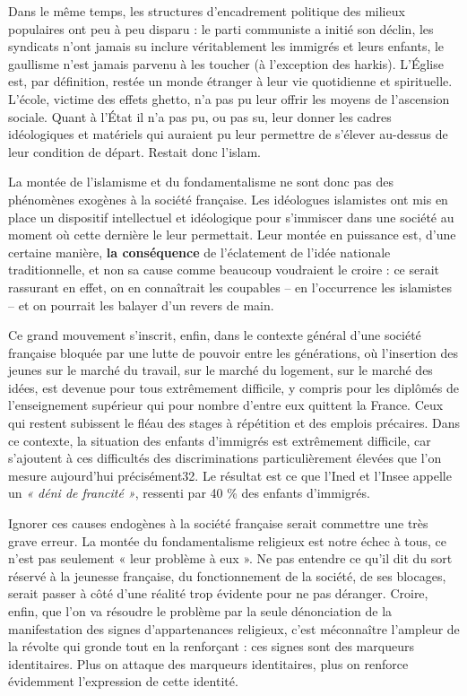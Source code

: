 Dans le même temps, les structures d'encadrement politique des milieux
populaires ont peu à peu disparu : le parti communiste a initié son
déclin, les syndicats n'ont jamais su inclure véritablement les immigrés
et leurs enfants, le gaullisme n'est jamais parvenu à les toucher (à
l'exception des harkis). L'Église est, par définition, restée un monde
étranger à leur vie quotidienne et spirituelle. L'école, victime des
effets ghetto, n'a pas pu leur offrir les moyens de l'ascension sociale.
Quant à l'État il n'a pas pu, ou pas su, leur donner les cadres
idéologiques et matériels qui auraient pu leur permettre de s'élever
au-dessus de leur condition de départ. Restait donc l'islam.



La montée de l'islamisme et du fondamentalisme ne sont donc pas des
phénomènes exogènes à la société française. Les idéologues islamistes
ont mis en place un dispositif intellectuel et idéologique pour
s'immiscer dans une société au moment où cette dernière le leur
permettait. Leur montée en puissance est, d'une certaine manière,
\textbf{la conséquence} de l'éclatement de l'idée nationale
traditionnelle, et non sa cause comme beaucoup voudraient le croire : ce
serait rassurant en effet, on en connaîtrait les coupables -- en
l'occurrence les islamistes -- et on pourrait les balayer d'un revers de
main.

Ce grand mouvement s'inscrit, enfin, dans le contexte général d'une
société française bloquée par une lutte de pouvoir entre les
générations, où l'insertion des jeunes sur le marché du travail, sur le
marché du logement, sur le marché des idées, est devenue pour tous
extrêmement difficile, y compris pour les diplômés de l'enseignement
supérieur qui pour nombre d'entre eux quittent la France. Ceux qui
restent subissent le fléau des stages à répétition et des emplois
précaires. Dans ce contexte, la situation des enfants d'immigrés est
extrêmement difficile, car s'ajoutent à ces difficultés des
discriminations particulièrement élevées que l'on mesure aujourd'hui
précisément32. Le résultat est ce que l'Ined et l'Insee appelle un
\emph{« déni de francité »}, ressenti par 40 \% des enfants d'immigrés.

Ignorer ces causes endogènes à la société française serait commettre une
très grave erreur. La montée du fondamentalisme religieux est notre
échec à tous, ce n'est pas seulement « leur problème à eux ». Ne pas
entendre ce qu'il dit du sort réservé à la jeunesse française, du
fonctionnement de la société, de ses blocages, serait passer à côté
d'une réalité trop évidente pour ne pas déranger. Croire, enfin, que
l'on va résoudre le problème par la seule dénonciation de la
manifestation des signes d'appartenances religieux, c'est méconnaître
l'ampleur de la révolte qui gronde tout en la renforçant : ces signes
sont des marqueurs identitaires. Plus on attaque des marqueurs
identitaires, plus on renforce évidemment l'expression de cette
identité.

